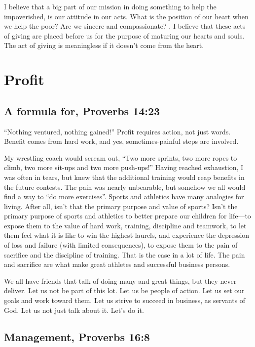 \documentclass[12pt]{memoir}
\begin{document}
I believe that a big part of our mission in doing something to help
the impoverished, is our attitude in our acts. What is the position
of our heart when we help the poor? Are we sincere and compassionate?
. I believe that these acts of giving are placed before us for the
purpose of maturing our hearts and souls. The act of giving is meaningless
if it doesn't come from the heart. 

\section{Profit}

\subsection{A formula for, Proverbs 14:23}

``Nothing ventured, nothing gained!'' Profit requires action, not
just words. Benefit comes from hard work, and yes, sometimes-painful
steps are involved.

My wrestling coach would scream out, ``Two more sprints, two more
ropes to climb, two more sit-ups and two more push-ups!'' Having
reached exhaustion, I was often in tears, but knew that the additional
training would reap benefits in the future contests. The pain was
nearly unbearable, but somehow we all would find a way to ``do more
exercises''. Sports and athletics have many analogies for living.
After all, isn't that the primary purpose and value of sports? Isn't
the primary purpose of sports and athletics to better prepare our
children for life---to expose them to the value of hard work, training,
discipline and teamwork, to let them feel what it is like to win the
highest laurels, and experience the depression of loss and failure
(with limited consequences), to expose them to the pain of sacrifice
and the discipline of training. That is the case in a lot of life.
The pain and sacrifice are what make great athletes and successful
business persons.

We all have friends that talk of doing many and great things, but
they never deliver. Let us not be part of this lot. Let us be people
of action. Let us set our goals and work toward them. Let us strive
to succeed in business, as servants of God. Let us not just talk about
it. Let's do it.

\subsection{Management, Proverbs 16:8}
\end{document}
